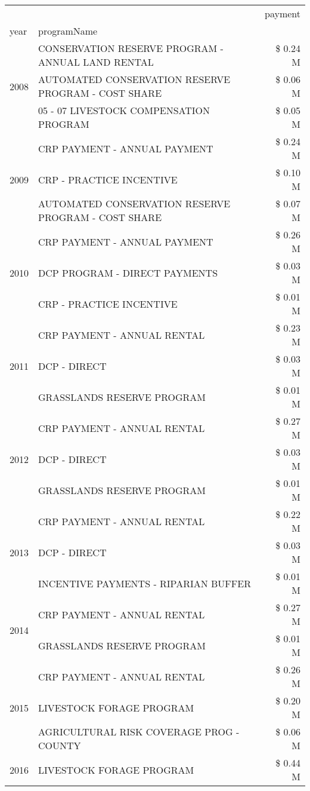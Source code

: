 \begin{tabular}{llr}
\toprule
 &  & payment \\
year & programName &  \\
\midrule
\multirow[t]{3}{*}{2008} & CONSERVATION RESERVE PROGRAM - ANNUAL LAND RENTAL & \$ 0.24 M \\
 & AUTOMATED CONSERVATION RESERVE PROGRAM - COST SHARE & \$ 0.06 M \\
 & 05 - 07 LIVESTOCK COMPENSATION PROGRAM & \$ 0.05 M \\
\cline{1-3}
\multirow[t]{3}{*}{2009} & CRP PAYMENT - ANNUAL PAYMENT & \$ 0.24 M \\
 & CRP - PRACTICE INCENTIVE & \$ 0.10 M \\
 & AUTOMATED CONSERVATION RESERVE PROGRAM - COST SHARE & \$ 0.07 M \\
\cline{1-3}
\multirow[t]{3}{*}{2010} & CRP PAYMENT - ANNUAL PAYMENT & \$ 0.26 M \\
 & DCP PROGRAM - DIRECT PAYMENTS & \$ 0.03 M \\
 & CRP - PRACTICE INCENTIVE & \$ 0.01 M \\
\cline{1-3}
\multirow[t]{3}{*}{2011} & CRP PAYMENT - ANNUAL RENTAL & \$ 0.23 M \\
 & DCP - DIRECT & \$ 0.03 M \\
 & GRASSLANDS RESERVE PROGRAM & \$ 0.01 M \\
\cline{1-3}
\multirow[t]{3}{*}{2012} & CRP PAYMENT - ANNUAL RENTAL & \$ 0.27 M \\
 & DCP - DIRECT & \$ 0.03 M \\
 & GRASSLANDS RESERVE PROGRAM & \$ 0.01 M \\
\cline{1-3}
\multirow[t]{3}{*}{2013} & CRP PAYMENT - ANNUAL RENTAL & \$ 0.22 M \\
 & DCP - DIRECT & \$ 0.03 M \\
 & INCENTIVE PAYMENTS - RIPARIAN BUFFER & \$ 0.01 M \\
\cline{1-3}
\multirow[t]{2}{*}{2014} & CRP PAYMENT - ANNUAL RENTAL & \$ 0.27 M \\
 & GRASSLANDS RESERVE PROGRAM & \$ 0.01 M \\
\cline{1-3}
\multirow[t]{3}{*}{2015} & CRP PAYMENT - ANNUAL RENTAL & \$ 0.26 M \\
 & LIVESTOCK FORAGE PROGRAM & \$ 0.20 M \\
 & AGRICULTURAL RISK COVERAGE PROG - COUNTY & \$ 0.06 M \\
\cline{1-3}
\multirow[t]{3}{*}{2016} & LIVESTOCK FORAGE PROGRAM & \$ 0.44 M \\

\end{tabular}
